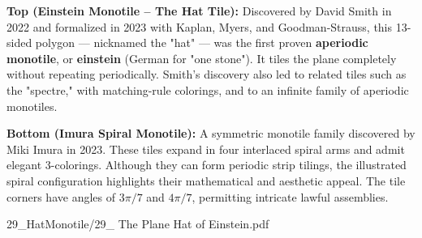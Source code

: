 \begin{SideNotePage}{
  \textbf{Top (Einstein Monotile – The Hat Tile):}  
  Discovered by David Smith in 2022 and formalized in 2023 with Kaplan, Myers, and Goodman-Strauss, this 13-sided polygon — nicknamed the "hat" — was the first proven \textbf{aperiodic monotile}, or \textbf{einstein} (German for "one stone"). It tiles the plane completely without repeating periodically. Smith’s discovery also led to related tiles such as the "spectre," with matching-rule colorings, and to an infinite family of aperiodic monotiles. \par

  \textbf{Bottom (Imura Spiral Monotile):}  
  A symmetric monotile family discovered by Miki Imura in 2023. These tiles expand in four interlaced spiral arms and admit elegant 3-colorings. Although they can form periodic strip tilings, the illustrated spiral configuration highlights their mathematical and aesthetic appeal. The tile corners have angles of $3\pi/7$ and $4\pi/7$, permitting intricate lawful assemblies. \par

}{29_HatMonotile/29_ The Plane Hat of Einstein.pdf}
\end{SideNotePage}
